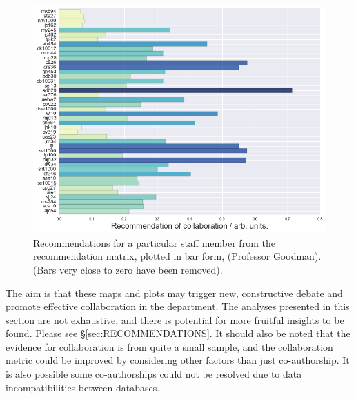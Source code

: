 \begin{center}
\begin{figure}[H]
  \centering
    \includegraphics[width=\textwidth]{Analysis/jmg.png}
    \caption{Recommendations for a particular staff member from the recommendation matrix, plotted in bar form, (Professor Goodman). (Bars very close to zero have been removed). }
    \label{fig:RECOMM_BAR}
\end{figure} 
\end{center}
The aim is that these maps and plots may trigger new, constructive debate and promote effective collaboration in the department. The analyses presented in this section are not exhaustive, and there is potential for more fruitful insights to be found. Please see \S\ref{sec:RECOMMENDATIONS}. It should also be noted that the evidence for collaboration is from quite a small sample, and the collaboration metric could be improved by considering other factors than just co-authorship. It is also possible some co-authorships could not be resolved due to data incompatibilities between databases.

